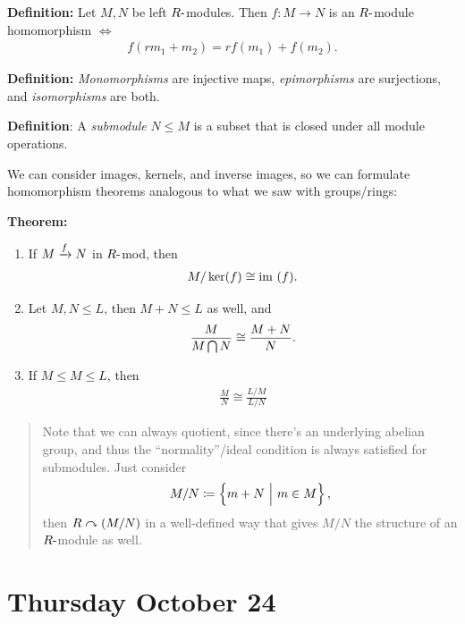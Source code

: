 \textbf{Definition:} Let \(M, N\) be left \(R{\hbox{-}}\)modules. Then
\(f: M \to N\) is an \(R{\hbox{-}}\)module homomorphism \(\iff\)
\begin{align*}
f(rm_1 + m_2) = rf(m_1) + f(m_2)
.\end{align*}

\textbf{Definition:} \emph{Monomorphisms} are injective maps,
\emph{epimorphisms} are surjections, and \emph{isomorphisms} are both.

\textbf{Definition}: A \emph{submodule} \(N\leq M\) is a subset that is
closed under all module operations.

We can consider images, kernels, and inverse images, so we can formulate
homomorphism theorems analogous to what we saw with groups/rings:

\textbf{Theorem:}

\begin{enumerate}
\def\labelenumi{\arabic{enumi}.}
\item
  If \(M \xrightarrow{f} N\) in \(R{\hbox{-}}\)mod, then
  \begin{align*}
  M / \ker(f) \cong {\text{im}~}(f)
  .\end{align*}
\item
  Let \(M, N \leq L\), then \(M+N \leq L\) as well, and
  \begin{align*}
  \frac{M}{M\bigcap N} \cong \frac{M+N}{N}
  .\end{align*}
\item
  If \(M\leq M\leq L\), then
  \begin{align*}
  \frac{M}{N} \cong \frac{L/M}{L/N}
  \end{align*}
\end{enumerate}

\begin{quote}
Note that we can always quotient, since there's an underlying abelian
group, and thus the ``normality''/ideal condition is always satisfied
for submodules. Just consider
\begin{align*}
M/N  \coloneqq \left\{{m + N {~\mathrel{\Big|}~} m\in M}\right\}
,\end{align*} then \(R\curvearrowright (M/N)\) in a well-defined way that gives
\(M/N\) the structure of an \(R{\hbox{-}}\)module as well.
\end{quote}

\hypertarget{thursday-october-24}{%
\section{Thursday October 24}\label{thursday-october-24}}

